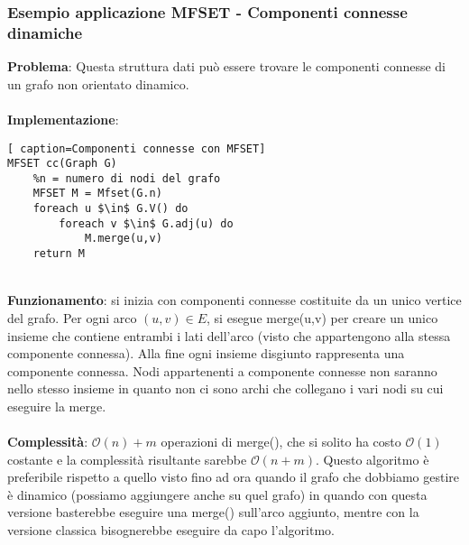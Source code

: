 \documentclass[../cheatSheetAlgoritmi.tex]{subfiles}
\begin{document}
\subsubsection{Esempio applicazione MFSET - Componenti connesse dinamiche}
\textbf{Problema}: Questa struttura dati può essere trovare le componenti connesse di un grafo non orientato dinamico.\\\\
\textbf{Implementazione}:
\begin{lstlisting}[ caption=Componenti connesse con MFSET]
MFSET cc(Graph G)
	%n = numero di nodi del grafo
	MFSET M = Mfset(G.n)
	foreach u $\in$ G.V() do
		foreach v $\in$ G.adj(u) do
			M.merge(u,v)
	return M
\end{lstlisting} 
\textbf{\\Funzionamento}: si inizia con componenti connesse costituite da un unico vertice del grafo. Per ogni arco $(u,v) \in E$, si esegue merge(u,v) per creare un unico insieme che contiene entrambi i lati dell'arco (visto che appartengono alla stessa componente connessa). Alla fine ogni insieme disgiunto rappresenta una componente connessa. Nodi appartenenti a componente connesse non saranno nello stesso insieme in quanto non ci sono archi che collegano i vari nodi su cui eseguire la merge.\\\\
\textbf{Complessità}: $\mathcal{O}(n) + m$ operazioni di merge(), che si solito ha costo $\mathcal{O}(1)$ costante e la complessità risultante sarebbe $\mathcal{O}(n+m)$. Questo algoritmo è preferibile rispetto a quello visto fino ad ora quando il grafo che dobbiamo gestire è dinamico (possiamo aggiungere anche su quel grafo) in quando con questa versione basterebbe eseguire una merge() sull'arco aggiunto, mentre con la versione classica bisognerebbe eseguire da capo l'algoritmo. \\\\
\newpage
\end{document}
